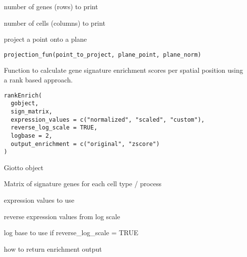 \documentclass[a4paper]{book}
\begin{document}
%
\begin{Arguments}
\begin{ldescription}
\item[\code{nr\_genes}] number of genes (rows) to print

\item[\code{nr\_cells}] number of cells (columns) to print
\end{ldescription}
\end{Arguments}
%
\begin{Description}\relax
project a point onto a plane
\end{Description}
%
\begin{Usage}
\begin{verbatim}
projection_fun(point_to_project, plane_point, plane_norm)
\end{verbatim}
\end{Usage}
%
\begin{Description}\relax
Function to calculate gene signature enrichment scores per spatial position using a rank based approach.
\end{Description}
%
\begin{Usage}
\begin{verbatim}
rankEnrich(
  gobject,
  sign_matrix,
  expression_values = c("normalized", "scaled", "custom"),
  reverse_log_scale = TRUE,
  logbase = 2,
  output_enrichment = c("original", "zscore")
)
\end{verbatim}
\end{Usage}
%
\begin{Arguments}
\begin{ldescription}
\item[\code{gobject}] Giotto object

\item[\code{sign\_matrix}] Matrix of signature genes for each cell type / process

\item[\code{expression\_values}] expression values to use

\item[\code{reverse\_log\_scale}] reverse expression values from log scale

\item[\code{logbase}] log base to use if reverse\_log\_scale = TRUE

\item[\code{output\_enrichment}] how to return enrichment output
\end{ldescription}
\end{Arguments}
\end{document}
